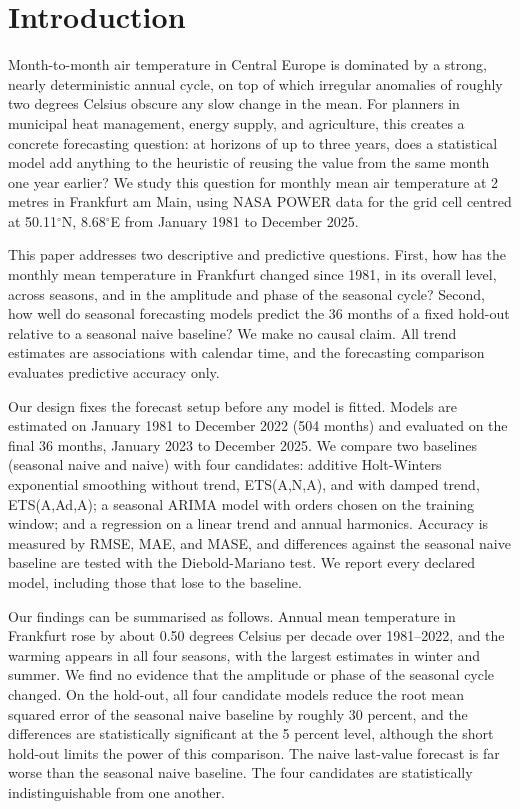 \section{Introduction}

Month-to-month air temperature in Central Europe is dominated by a strong, nearly deterministic annual cycle, on top of which irregular anomalies of roughly two degrees Celsius obscure any slow change in the mean. For planners in municipal heat management, energy supply, and agriculture, this creates a concrete forecasting question: at horizons of up to three years, does a statistical model add anything to the heuristic of reusing the value from the same month one year earlier? We study this question for monthly mean air temperature at 2 metres in Frankfurt am Main, using NASA POWER data \citep{NASA_POWER} for the grid cell centred at 50.11$^\circ$N, 8.68$^\circ$E from January 1981 to December 2025.

This paper addresses two descriptive and predictive questions. First, how has the monthly mean temperature in Frankfurt changed since 1981, in its overall level, across seasons, and in the amplitude and phase of the seasonal cycle? Second, how well do seasonal forecasting models predict the 36 months of a fixed hold-out relative to a seasonal naive baseline? We make no causal claim. All trend estimates are associations with calendar time, and the forecasting comparison evaluates predictive accuracy only.

Our design fixes the forecast setup before any model is fitted. Models are estimated on January 1981 to December 2022 (504 months) and evaluated on the final 36 months, January 2023 to December 2025. We compare two baselines (seasonal naive and naive) with four candidates: additive Holt-Winters exponential smoothing without trend, ETS(A,N,A), and with damped trend, ETS(A,Ad,A); a seasonal ARIMA model with orders chosen on the training window; and a regression on a linear trend and annual harmonics. Accuracy is measured by RMSE, MAE, and MASE, and differences against the seasonal naive baseline are tested with the Diebold-Mariano test. We report every declared model, including those that lose to the baseline.

Our findings can be summarised as follows. Annual mean temperature in Frankfurt rose by about 0.50 degrees Celsius per decade over 1981--2022, and the warming appears in all four seasons, with the largest estimates in winter and summer. We find no evidence that the amplitude or phase of the seasonal cycle changed. On the hold-out, all four candidate models reduce the root mean squared error of the seasonal naive baseline by roughly 30 percent, and the differences are statistically significant at the 5 percent level, although the short hold-out limits the power of this comparison. The naive last-value forecast is far worse than the seasonal naive baseline. The four candidates are statistically indistinguishable from one another.


